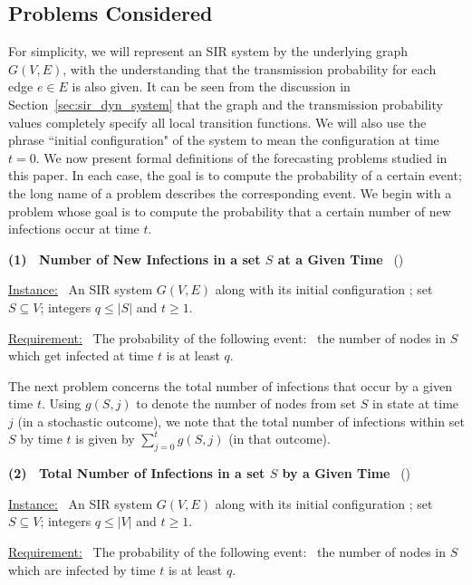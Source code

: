 \subsection{Problems Considered}
\label{sse:prob_formulation}

For simplicity, we will represent an SIR
system by the underlying graph $G(V,E)$, with the
understanding that the transmission probability for each
edge $e \in E$ is also given.
It can be seen from the discussion in Section~\ref{sec:sir_dyn_system}
that the graph and the transmission probability values completely
specify all local transition functions. 
We will also use the phrase ``initial configuration" of the
system to mean the configuration at time $t = 0$.
We now present formal definitions of the forecasting problems 
studied in this paper.
In each case, the goal is to compute the probability 
of a certain event; the long name of a problem describes the
corresponding event.
We begin with a problem whose goal is to compute
the probability that a certain number of 
new infections occur at time $t$. 

\medskip

\noindent
\textbf{(1)~ Number of New Infections in a set $S$ at a Given Time}~ (\tNewInfs)

\medskip
\noindent
\underline{Instance:}~ An SIR system $G(V,E)$ along with its initial
configuration \cali; set $S \subseteq V$; integers $q \leq |S|$ and $t \geq 1$.

\smallskip
\noindent
\underline{Requirement:}~ The probability of the following
event:~ the number of nodes in $S$ which get infected at time 
$t$ is at least $q$.

\medskip
The next problem concerns the total number of 
infections that occur by a given time $t$. 
Using $g(S, j)$ to denote the number of nodes from set $S$ in state \istate{}
at time $j$ (in a stochastic outcome), we note that the total number of infections 
within set $S$ by
time $t$ is given by $\sum_{j=0}^{t} g(S, j)$ (in that outcome).

\medskip
\noindent
\textbf{(2)~ Total Number of Infections in a set $S$ by a Given Time}~ (\tTotInfs)

\medskip
\noindent
\underline{Instance:}~ An SIR system $G(V,E)$ along with its initial
configuration \cali; set $S \subseteq V$; integers $q \leq |V|$ and $t \geq 1$.

\smallskip
\noindent
\underline{Requirement:}~ The probability of the following event:~
the number of nodes
in $S$ which are infected by time $t$ is at least $q$.

